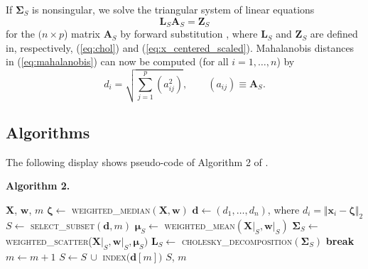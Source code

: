 \documentclass[a4paper,oneside,11pt,DIV=12]{scrartcl}
\newcommand{\code}[1]{{\texttt{#1}}}
\begin{document}
\noindent If $\bm \Sigma_S$ is nonsingular, we solve the triangular system of linear equations
\begin{equation}\label{eq:inverse_chol}
	\bm L_S \bm  A_S= \bm Z_S
\end{equation}
\noindent for the $(n \times p$) matrix $\bm A_S$ by forward substitution \citep[\code{BLAS}: \code{dtrsm},][]{blackford_petitet_etal_2002}, where $\bm L_S$ and $\bm Z_S$ are defined in, respectively, (\ref{eq:chol}) and  (\ref{eq:x_centered_scaled}). Mahalanobis distances in (\ref{eq:mahalanobis}) can now be computed (for all $i=1,\ldots, n$) by
\begin{equation}\label{eq:maha_chol}
	d_i = \sqrt{\sum_{j=1}^p (a_{ij}^2)}, \qquad (a_{ij}) \equiv \bm A_S. 
\end{equation}

\subsection{Algorithms}
The following display shows pseudo-code of Algorithm 2 of \citet{billor_hadi_etal_2000}.  

\vspace{1em}
\noindent \textbf{\sffamily Algorithm 2.}  
\begin{algorithmic}[1]\label{}
	\hypertarget{alg:alg2}{\Require $\bm X$, $\bm w$, $m$}
	\State $\bm \zeta \gets$ \textsc{weighted\_median}$(\bm X, \bm w)$
	\State $\bm d \gets (d_1, \ldots, d_n)$, where $d_i = \Vert \bm x_i - \bm \zeta \Vert_2$
	\State $S \gets$ \textsc{select\_subset}$(\bm d, m)$
		\State $\bm \mu_S \gets$ \textsc{weighted\_mean}$(\bm X\vert_S, \bm w\vert_S)$
		\State $\bm \Sigma_S \gets$ \textsc{weighted\_scatter}($\bm X\vert_S, \bm w\vert_S, \bm \mu_S)$
			\State $\bm L_S \gets$ \textsc{cholesky\_decomposition}$(\bm \Sigma_S)$
				\State \textbf{break}
			\EndIf
		\EndIf 
			\State $m \gets m + 1$
			\State $S \gets S \, \cup$ \textsc{index}$\big(\bm d[m]\big)$
	\EndWhile
	\State \Return $S$, $m$
\end{algorithmic}
\end{document}

